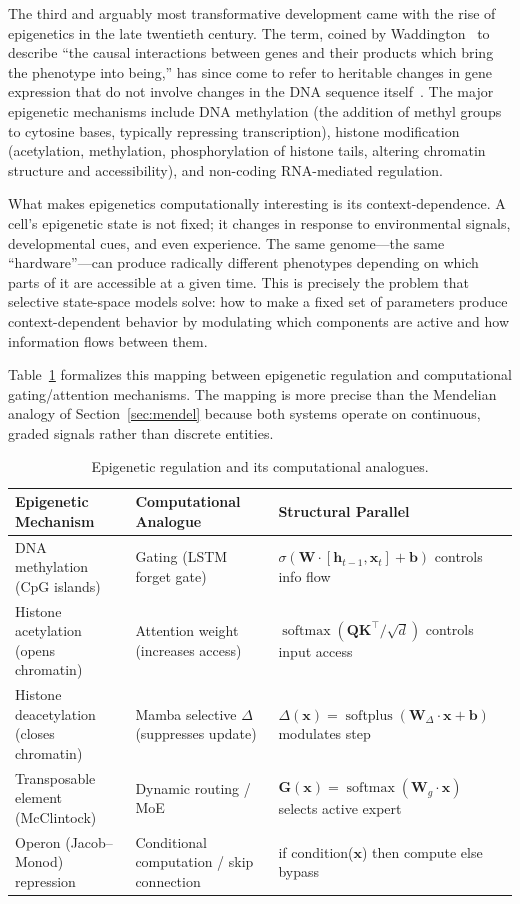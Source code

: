 \documentclass[12pt,a4paper]{article}
\newcommand{\D}{\Delta}
\newcommand{\softplus}{\operatorname{softplus}}
\renewcommand{\vec}[1]{\mathbf{#1}}
\begin{document}
The third and arguably most transformative development came with the rise of epigenetics in the late twentieth century. The term, coined by Waddington~\cite{waddington1942} to describe ``the causal interactions between genes and their products which bring the phenotype into being,'' has since come to refer to heritable changes in gene expression that do not involve changes in the DNA sequence itself~\cite{bird2007}. The major epigenetic mechanisms include DNA methylation (the addition of methyl groups to cytosine bases, typically repressing transcription), histone modification (acetylation, methylation, phosphorylation of histone tails, altering chromatin structure and accessibility), and non-coding RNA-mediated regulation.

What makes epigenetics computationally interesting is its context-dependence. A cell's epigenetic state is not fixed; it changes in response to environmental signals, developmental cues, and even experience. The same genome---the same ``hardware''---can produce radically different phenotypes depending on which parts of it are accessible at a given time. This is precisely the problem that selective state-space models solve: how to make a fixed set of parameters produce context-dependent behavior by modulating which components are active and how information flows between them.

Table~\ref{tab:epigenetic} formalizes this mapping between epigenetic regulation and computational gating/attention mechanisms. The mapping is more precise than the Mendelian analogy of Section~\ref{sec:mendel} because both systems operate on continuous, graded signals rather than discrete entities.

\begin{table}[htbp]
\centering
\caption{Epigenetic regulation and its computational analogues.}
\label{tab:epigenetic}
\begin{tabular}{lll}
\toprule
\textbf{Epigenetic Mechanism} & \textbf{Computational Analogue} & \textbf{Structural Parallel} \\
\midrule
DNA methylation (CpG islands) & Gating (LSTM forget gate) & $\sigma(\mathbf{W} \cdot [\vec{h}_{t-1}, \vec{x}_t] + \vec{b})$ controls info flow \\
Histone acetylation (opens chromatin) & Attention weight (increases access) & $\operatorname{softmax}(\mathbf{Q}\mathbf{K}^\top / \sqrt{d})$ controls input access \\
Histone deacetylation (closes chromatin) & Mamba selective $\D$ (suppresses update) & $\D(\vec{x}) = \softplus(\mathbf{W}_\D \cdot \vec{x} + \vec{b})$ modulates step \\
Transposable element (McClintock) & Dynamic routing / MoE & $\mathbf{G}(\vec{x}) = \operatorname{softmax}(\mathbf{W}_g \cdot \vec{x})$ selects active expert \\
Operon (Jacob--Monod) repression & Conditional computation / skip connection & if condition($\vec{x}$) then compute else bypass \\
\bottomrule
\end{tabular}
\end{table}
\end{document}
